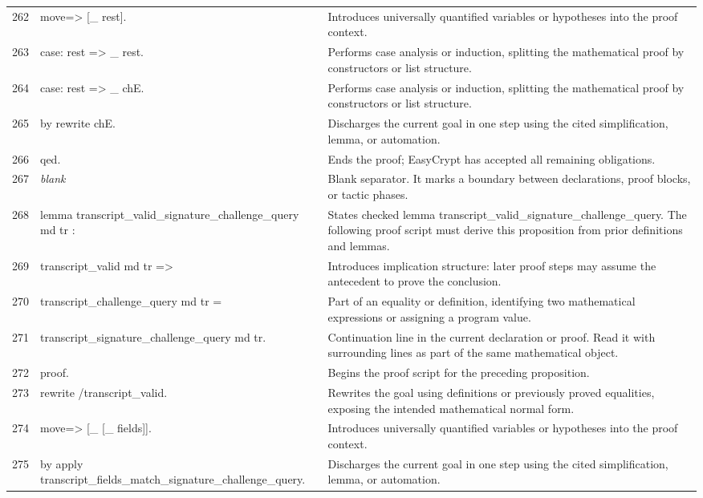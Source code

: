 \documentclass[10pt]{article}
\begin{document}
\begin{longtable}{r L{0.53\textwidth} L{0.37\textwidth}}
262 & {\ttfamily\scriptsize move=> [\_ rest].} & Introduces universally quantified variables or hypotheses into the proof context. \\
263 & {\ttfamily\scriptsize case: rest => \_ rest.} & Performs case analysis or induction, splitting the mathematical proof by constructors or list structure. \\
264 & {\ttfamily\scriptsize case: rest => \_ chE.} & Performs case analysis or induction, splitting the mathematical proof by constructors or list structure. \\
265 & {\ttfamily\scriptsize by rewrite chE.} & Discharges the current goal in one step using the cited simplification, lemma, or automation. \\
266 & {\ttfamily\scriptsize qed.} & Ends the proof; EasyCrypt has accepted all remaining obligations. \\
267 & {\ttfamily\scriptsize \emph{blank}} & Blank separator.  It marks a boundary between declarations, proof blocks, or tactic phases. \\
268 & {\ttfamily\scriptsize lemma transcript\_valid\_signature\_challenge\_query md tr :} & States checked lemma transcript\_valid\_signature\_challenge\_query.  The following proof script must derive this proposition from prior definitions and lemmas. \\
269 & {\ttfamily\scriptsize   transcript\_valid md tr =>} & Introduces implication structure: later proof steps may assume the antecedent to prove the conclusion. \\
270 & {\ttfamily\scriptsize   transcript\_challenge\_query md tr =} & Part of an equality or definition, identifying two mathematical expressions or assigning a program value. \\
271 & {\ttfamily\scriptsize   transcript\_signature\_challenge\_query md tr.} & Continuation line in the current declaration or proof.  Read it with surrounding lines as part of the same mathematical object. \\
272 & {\ttfamily\scriptsize proof.} & Begins the proof script for the preceding proposition. \\
273 & {\ttfamily\scriptsize rewrite /transcript\_valid.} & Rewrites the goal using definitions or previously proved equalities, exposing the intended mathematical normal form. \\
274 & {\ttfamily\scriptsize move=> [\_ [\_ fields]].} & Introduces universally quantified variables or hypotheses into the proof context. \\
275 & {\ttfamily\scriptsize by apply transcript\_fields\_match\_signature\_challenge\_query.} & Discharges the current goal in one step using the cited simplification, lemma, or automation. \\

\end{longtable}
\end{document}
